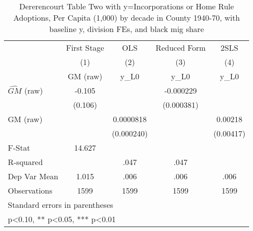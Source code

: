 \begin{table}[htbp]\centering
\def\sym#1{\ifmmode^{#1}\else\(^{#1}\)\fi}
\caption{Dererencourt Table Two with y=Incorporations or Home Rule Adoptions, Per Capita (1,000) by decade in County 1940-70, with baseline y, division FEs, and black mig share}
\begin{tabular}{l*{4}{c}}
\toprule
                    & First Stage   &         OLS   &Reduced Form   &        2SLS   \\
                    &\multicolumn{1}{c}{(1)}&\multicolumn{1}{c}{(2)}&\multicolumn{1}{c}{(3)}&\multicolumn{1}{c}{(4)}\\
                    &\multicolumn{1}{c}{GM  (raw)}&\multicolumn{1}{c}{y\_L0}&\multicolumn{1}{c}{y\_L0}&\multicolumn{1}{c}{y\_L0}\\
\midrule
$\hat{GM}$ (raw)    &      -0.105   &               &   -0.000229   &               \\
                    &     (0.106)   &               &  (0.000381)   &               \\
\addlinespace
GM  (raw)           &               &   0.0000818   &               &     0.00218   \\
                    &               &  (0.000240)   &               &   (0.00417)   \\
\midrule
F-Stat              &      14.627   &               &               &               \\
R-squared           &               &        .047   &        .047   &               \\
Dep Var Mean        &       1.015   &        .006   &        .006   &        .006   \\
Observations        &        1599   &        1599   &        1599   &        1599   \\
\bottomrule
\multicolumn{5}{l}{\footnotesize Standard errors in parentheses}\\
\multicolumn{5}{l}{\footnotesize * p<0.10, ** p<0.05, *** p<0.01}\\
\end{tabular}
\end{table}
